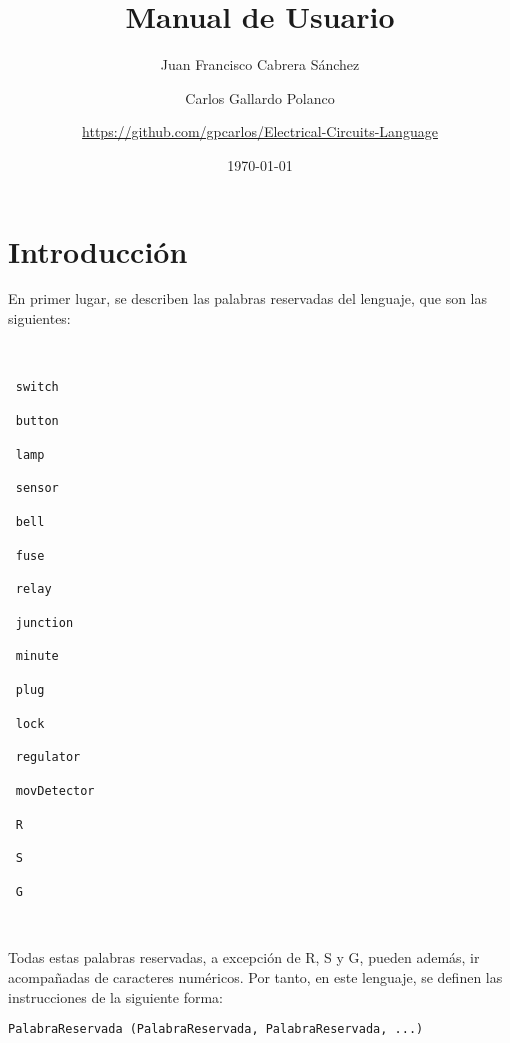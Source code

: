 \documentclass{article}
\author{Juan Francisco Cabrera Sánchez \and Carlos Gallardo Polanco \and \newline \url{https://github.com/gpcarlos/Electrical-Circuits-Language}}
\title{Manual de Usuario}
\date{\today}
\begin{document}
\maketitle

\section{Introducción}

En primer lugar, se describen las palabras reservadas del lenguaje, que son las siguientes:

\

\begin{center}
\begin{enumerate*}
  \item[$\ $]\texttt{switch}
  \item[$\ $]\texttt{button}
  \item[$\ $]\texttt{lamp}
  \item[$\ $]\texttt{sensor}
  \item[$\ $]\texttt{bell}
  \item[$\ $]\texttt{fuse}
  \item[$\ $]\texttt{relay}
  \item[$\ $]\texttt{junction}

\end{enumerate*}
\end{center}

\begin{center}
  \begin{enumerate*}
  \item[$\ $]\texttt{minute}
  \item[$\ $]\texttt{plug}
  \item[$\ $]\texttt{lock}
  \item[$\ $]\texttt{regulator}
  \item[$\ $]\texttt{movDetector}
  \item[$\ $]\texttt{R}
  \item[$\ $]\texttt{S}
  \item[$\ $]\texttt{G}
  \end{enumerate*}
\end{center}

\

Todas estas palabras reservadas, a excepción de R, S y G, pueden además, ir acompañadas de caracteres numéricos. Por tanto, en este lenguaje, se definen las instrucciones de la siguiente forma:

\begin{center} \texttt{PalabraReservada  (PalabraReservada, PalabraReservada, ...)} \end{center}
\end{document}
